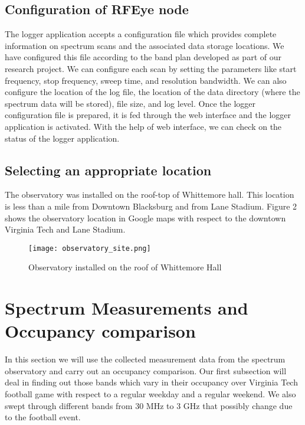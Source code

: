 \documentclass[12pt,sts]{report}
\begin{document}
\subsection{Configuration of RFEye node}
	
	The logger application accepts a configuration file which provides complete information on spectrum scans and the associated data storage locations. We have configured this file according to the band plan developed as part of our research project. We can configure each scan by setting the parameters like start frequency, stop frequency, sweep time, and resolution bandwidth. We can also configure the location of the log file, the location of the data directory (where the spectrum data will be stored), file size, and log level. Once the logger configuration file is prepared, it is fed through the web interface and the logger application is activated. With the help of web interface, we can check on the status of the logger application.

\subsection{Selecting an appropriate location}
	
	The observatory was installed on the roof-top of Whittemore hall. This location is less than a mile from Downtown Blacksburg and from Lane Stadium. Figure 2 shows the observatory location in Google maps with respect to the downtown Virginia Tech and Lane Stadium.
	
	\begin{figure}[ht!]
  \centering
    \texttt{[image: observatory\_site.png]}
		\caption{Observatory installed on the roof of Whittemore Hall}
	\end{figure}

\pagebreak


\section{Spectrum Measurements and Occupancy comparison}

In this section we will use the collected measurement data from the spectrum observatory and carry out an occupancy comparison. Our first subsection will deal in finding out those bands which vary in their occupancy over Virginia Tech football game with respect to a regular weekday and a regular weekend. We also swept through different bands from 30 MHz to 3 GHz that possibly change due to the football event.
\end{document}

